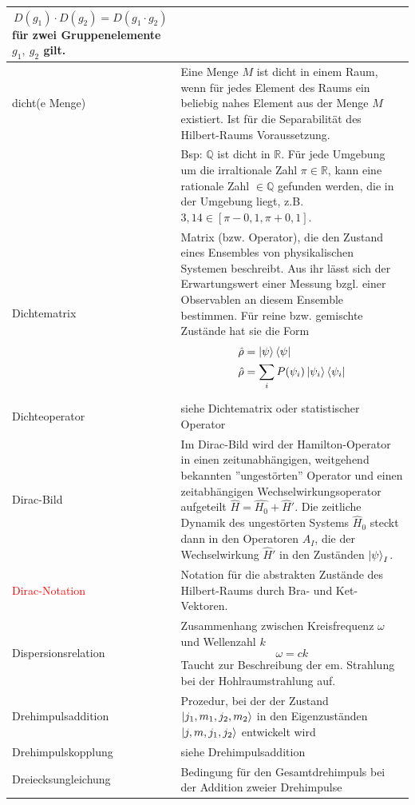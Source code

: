 \documentclass{article}
\begin{document}
\begin{xltabular}{\linewidth}{l|X}
		$$D(g_1) \cdot D(g_2) = D(g_1 \cdot g_2)$$	
für zwei Gruppenelemente $g_1,\ g_2$ gilt.\\
	\hline
		dicht(e Menge) & Eine Menge $M$ ist dicht in einem Raum, wenn für jedes Element des Raums ein beliebig nahes Element aus der Menge $M$ existiert. Ist für die Separabilität des Hilbert-Raums Voraussetzung.\\
		& \textcolor{gruen}{Bsp: $\mathbb{Q}$ ist dicht in $\mathbb{R}$. Für jede Umgebung um die irraltionale Zahl $\pi\in\mathbb{R}$, kann eine rationale Zahl $\in\mathbb{Q}$ gefunden werden, die in der Umgebung liegt, z.B. $3,14\in[\pi-0,1,\pi+0,1]$.}\\
	\hline
		Dichtematrix & Matrix (bzw. Operator), die den Zustand eines Ensembles von physikalischen Systemen beschreibt. Aus ihr lässt sich der Erwartungswert einer Messung bzgl. einer Observablen an diesem Ensemble bestimmen. Für reine bzw. gemischte Zustände hat sie die Form
		{\begin{align*}
			\hat{\rho} &= \ket{\psi} \bra{\psi} \\
			\hat{\rho} &= \sum_i P(\psi_i) \ket{\psi_i} \bra{\psi_i}
		\end{align*}}\\
	\hline
		Dichteoperator & siehe Dichtematrix oder statistischer Operator \\
	\hline
		Dirac-Bild & Im Dirac-Bild wird der Hamilton-Operator in einen zeitunabhängigen, weitgehend bekannten ''ungestörten'' Operator und einen zeitabhängigen Wechselwirkungsoperator aufgeteilt $\hat{H} = \hat{H_0} + \hat{H}'$. Die zeitliche Dynamik des ungestörten Systems $\hat{H}_0$ steckt dann in den Operatoren $\hat{A}_I$, die der Wechselwirkung $\hat{H}'$ in den Zuständen $\ket{\psi}_I$.\\
	\hline
		\textcolor{red}{Dirac-Notation} & Notation für die abstrakten Zustände des Hilbert-Raums durch Bra- und Ket-Vektoren. \\
	\hline
		Dispersionsrelation & Zusammenhang zwischen Kreisfrequenz $\omega$ und Wellenzahl $k$
			$$\omega = c k$$ 
		\textcolor{gruen}{Taucht zur Beschreibung der em. Strahlung bei der Hohlraumstrahlung auf.} \\
	\hline
		Drehimpulsaddition & Prozedur, bei der der Zustand $\ket{j_1,m_1,j_2,m_2}$ in den Eigenzuständen $\ket{j,m,j_1,j_2}$ entwickelt wird \\
	\hline
		Drehimpulskopplung & siehe Drehimpulsaddition \\
	\hline
		Dreiecksungleichung & Bedingung für den Gesamtdrehimpuls bei der Addition zweier Drehimpulse

\end{xltabular}
\end{document}
